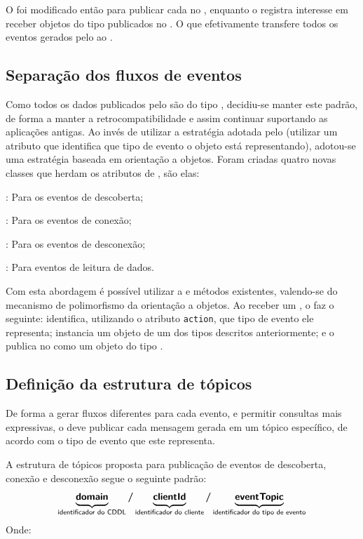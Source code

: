 O \stwopa foi modificado então para publicar cada \sensordata no \eventbus, enquanto o \qocevaluator registra interesse em receber objetos do tipo \sensordata publicados no \eventbus.
O que efetivamente transfere todos os eventos gerados pelo \stwopa ao \cddl.

\subsection{Separação dos fluxos de eventos}

Como todos os dados publicados pelo \cddl são do tipo \msg, decidiu-se manter este padrão, de forma a manter a retrocompatibilidade e assim continuar suportando as aplicações antigas.
Ao invés de utilizar a estratégia adotada pelo \mhub (utilizar um atributo que identifica que tipo de evento o objeto está representando), adotou-se uma estratégia baseada em orientação a objetos.
Foram criadas quatro novas classes que herdam os atributos de \msg, são elas:

\begin{alineas}
	\item \objfoundmsg: Para os eventos de descoberta;
	\item \objconnectedmsg: Para os eventos de conexão;
	\item \objdisconnectedmsg: Para os eventos de desconexão;
	\item \sensordatamsg: Para eventos de leitura de dados.
\end{alineas}

Com esta abordagem é possível utilizar a \api e métodos existentes, valendo-se do mecanismo de polimorfismo da orientação a objetos.
Ao receber um \sensordata, o \qocevaluator faz o seguinte: identifica, utilizando o atributo \texttt{action}, que tipo de evento ele representa; instancia um objeto de um dos tipos descritos anteriormente; e o publica no \broker \mqtt como um objeto do tipo \msg.


\subsection{Definição da estrutura de tópicos}

De forma a gerar fluxos diferentes para cada evento, e permitir consultas mais expressivas, o \qocevaluator deve publicar cada mensagem gerada em um tópico específico, de acordo com o tipo de evento que este representa.

A estrutura de tópicos proposta para publicação de eventos de descoberta, conexão e desconexão segue o seguinte padrão:
\[
	\underbrace{\bm{\mathsf{domain}}\vphantom{p}}_{\text{\textsf{identificador do CDDL}}}
	\bm{/}
	\underbrace{\bm{\mathsf{clientId}}\vphantom{p}}_{\text{\textsf{identificador do cliente}}}
	\bm{/}
	\underbrace{\bm{\mathsf{eventTopic}}}_{\text{\textsf{identificador do tipo de evento}}}
\]
Onde:

